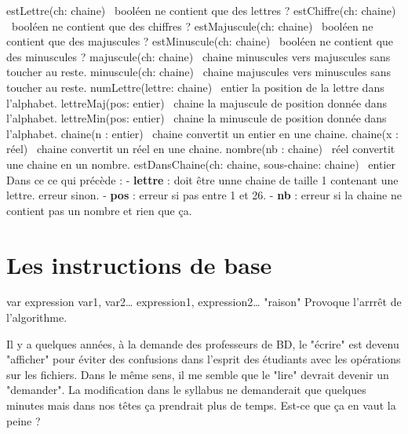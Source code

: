 	\begin{Pseudocode}
		\Stmt estLettre(ch: chaine) \Gives~booléen		\RComment ne contient que des lettres ?
		\Stmt estChiffre(ch: chaine) \Gives~booléen		\RComment ne contient que des chiffres ?
		\Stmt estMajuscule(ch: chaine) \Gives~booléen	\RComment ne contient que des majuscules ?
		\Stmt estMinuscule(ch: chaine) \Gives~booléen	\RComment ne contient que des minuscules ? 
		\Empty
		\Stmt majuscule(ch: chaine) \Gives~chaine		\RComment minuscules vers majuscules sans toucher au reste.
		\Stmt minuscule(ch: chaine) \Gives~chaine		\RComment majuscules vers minuscules sans toucher au reste.
		\Stmt numLettre(lettre: chaine) \Gives~entier	\RComment la position de la lettre dans l'alphabet.
		\Stmt lettreMaj(pos: entier) \Gives~chaine		\RComment la majuscule de position donnée dans l'alphabet.
		\Stmt lettreMin(pos: entier) \Gives~chaine		\RComment la minuscule de position donnée dans l'alphabet.
		\Stmt chaine(n : entier) \Gives~chaine			\RComment convertit un entier en une chaine.
		\Stmt chaine(x : réel) \Gives~chaine			\RComment convertit un réel en une chaine.
		\Stmt nombre(nb : chaine) \Gives~réel			\RComment convertit une chaine en un nombre.
		\Empty
		\Stmt estDansChaine(ch: chaine, sous-chaine: chaine) \Gives~entier 
		\Stmt 											{}
		\Empty
		\LComment Dans ce ce qui précède :
		\LComment - \textbf{lettre} : doit être unne chaine de taille 1 contenant une lettre. erreur sinon.
		\LComment - \textbf{pos} : erreur si pas entre 1 et 26.
		\LComment - \textbf{nb} : erreur si la chaine ne contient pas un nombre et rien que ça.
	\end{Pseudocode}

\section{Les instructions de base}

	\begin{Pseudocode}
	\Let var \Gets expression
	\Read var1, var2\dots
	\Write expression1, expression2\dots
	\Error "raison" \Comment Provoque l'arrrêt de l'algorithme.
	\end{Pseudocode}

	\begin{Note}
	Il y a quelques années, à la demande des professeurs de BD,
	le "écrire" est devenu "afficher" pour éviter des confusions
	dans l'esprit des étudiants avec les opérations sur les fichiers. 
	Dans le même sens, il me semble que le "lire" devrait
	devenir un "demander". 
	La modification dans le syllabus ne demanderait que quelques
	minutes mais dans nos têtes ça prendrait plus de temps.
	Est-ce que ça en vaut la peine ?
	\end{Note}

